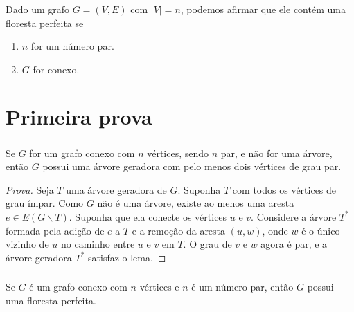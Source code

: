 \documentclass{beamer}
\begin{document}
\begin{frame} %
    \frametitle{}

    \begin{corollary}
        Dado um grafo $G = (V, E)$ com $|V| = n$, podemos afirmar que ele contém uma floresta perfeita se
        \begin{enumerate}
            \item $n$ for um número par.
            \item $G$ for conexo.
        \end{enumerate}
    \end{corollary}

\end{frame}

\section{Primeira prova}

\begin{frame} %
    \frametitle{}

    \begin{lemma}
        Se $G$ for um grafo conexo com $n$ vértices, sendo $n$ par, e não for uma árvore, então $G$ possui uma árvore geradora com pelo menos dois vértices de grau par.
    \end{lemma}

    \begin{proof}[Prova]
        Seja $T$ uma árvore geradora de $G$.
        Suponha $T$ com todos os vértices de grau ímpar.
        Como $G$ não é uma árvore, existe ao menos uma aresta $e \in E(G \backslash T)$.
        Suponha que ela conecte os vértices $u$ e $v$.
        Considere a árvore $T^{*}$ formada pela adição de $e$ a $T$ e a remoção da aresta $(u, w)$, onde $w$ é o único vizinho de $u$ no caminho entre $u$ e $v$ em $T$. O grau de $v$ e $w$ agora é par, e a árvore geradora $T^{*}$ satisfaz o lema.
    \end{proof}

\end{frame}


\begin{frame} %
    \frametitle{}

    \begin{theorem}
        Se $G$ é um grafo conexo com $n$ vértices e $n$ é um número par, então $G$ possui uma floresta perfeita.
    \end{theorem}


\end{frame}
\end{document}
